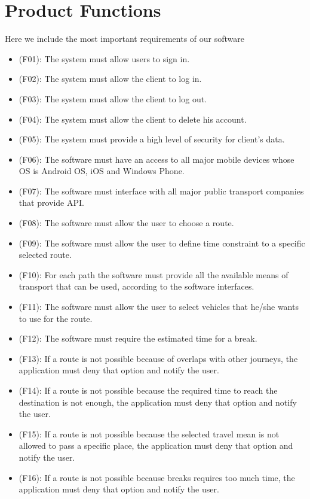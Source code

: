\documentclass[a4paper,leqno]{book}
\begin{document}
\section{Product Functions}
Here we include the most important requirements of our software

\begin{itemize}
	
	\item (F01): The system must allow users to sign in.
	\item (F02): The system must allow the client to log in.
	\item (F03): The system must allow the client to log out.
	\item (F04): The system must allow the client to delete his account.
	\item (F05): The system must provide a high level of security for client's data.
	\item (F06): The software must have an access to all major mobile devices whose OS is Android OS, iOS and Windows Phone.
	\item (F07): The software must interface with all major public transport companies that provide API.
	\item (F08): The software must allow the user to choose a route.
	\item (F09): The software must allow the user to define time constraint to a specific selected route.
	\item (F10): For each path the software must provide all the available means of transport that can be used, according to the software interfaces.
	\item (F11): The software must allow the user to select vehicles that he/she wants to use for the route.
	\item (F12): The software must require the estimated time for a break.
	\item (F13): If a route is not possible because of overlaps with other journeys, the application must deny that option and notify the user.
	\item (F14): If a route is not possible because the required time to reach the destination is not enough, the application must deny that option and notify the user.
	\item (F15): If a route is not possible because the selected travel mean is not allowed to pass a specific place, the application must deny that option and notify the user.
	\item (F16): If a route is not possible because breaks requires too much time, the application must deny that option and notify the user.

\end{itemize}
\end{document}
